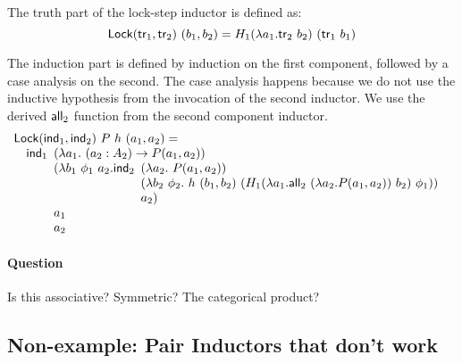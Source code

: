 \documentclass{article}
\begin{document}
The truth part of the lock-step inductor is defined as:
\begin{displaymath}
  \mathsf{Lock}(\mathsf{tr}_1, \mathsf{tr}_2)\ (b_1,b_2) = H_1(\lambda a_1. \mathsf{tr}_2\ b_2)\ (\mathsf{tr}_1\ b_1)
\end{displaymath}

The induction part is defined by induction on the first component,
followed by a case analysis on the second. The case analysis happens
because we do not use the inductive hypothesis from the invocation of
the second inductor. We use the derived $\mathsf{all}_2$ function from the
second component inductor.
\begin{displaymath}
  \begin{array}[t]{l}
    \mathsf{Lock}(\ind_1, \ind_2)\ P\ h\ (a_1,a_2) = \\
    \quad \ind_1
    \begin{array}[t]{l}
      (\lambda a_1.\ (a_2 : A_2) \to P(a_1,a_2)) \\
      (\lambda b_1\ \phi_1\ a_2. \ind_2
      \begin{array}[t]{l}
        (\lambda a_2.\ P(a_1,a_2)) \\
        (\lambda b_2\ \phi_2.\ h\ (b_1,b_2)\ (H_1(\lambda a_1. \all_2\ (\lambda a_2. P(a_1,a_2))\ b_2)\ \phi_1)) \\
        a_2)
      \end{array} \\
      a_1 \\
      a_2
    \end{array}
  \end{array}
\end{displaymath}


\paragraph{Question} Is this associative? Symmetric? The categorical
product?

\subsection{Non-example: Pair Inductors that don't work}

\end{document}
